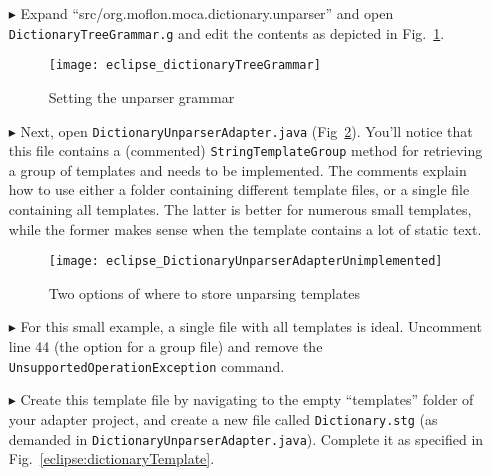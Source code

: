 \begin{itemize}

\item[$\blacktriangleright$] Expand ``src/org.moflon.moca.dictionary.unparser'' and open \texttt{Dict\-ion\-ary\-Tree\-Gram\-mar.g} and edit the contents as
depicted in Fig.~\ref{eclipse:treeGrammar}. 

\vspace{0.5cm}

\begin{figure}[htpb]
\begin{center}
  \texttt{[image: eclipse\_dictionaryTreeGrammar]}
  \caption{Setting the unparser grammar}
  \label{eclipse:treeGrammar}
\end{center}
\end{figure}

\newpage


\item[$\blacktriangleright$] Next, open \texttt{Dict\-ion\-ary\-Un\-pars\-er\-Ad\-ap\-ter.java} (Fig~\ref{eclipse:unparserCommented}). You'll notice that this
file contains a (commented) \texttt{StringTemplateGroup} method for retrieving a group of templates and needs to be implemented. The comments explain how to use
either a folder containing different template files, or a single file containing all templates. The latter is better for numerous small templates, while the
former makes sense when the template contains a lot of static text.

\vspace{0.5cm}

\begin{figure}[htpb]
\begin{center}
  \texttt{[image: eclipse\_DictionaryUnparserAdapterUnimplemented]}
  \caption{Two options of where to store unparsing templates}
  \label{eclipse:unparserCommented}
\end{center}
\end{figure}


\item[$\blacktriangleright$] For this small example, a single file with all templates is ideal. Uncomment line 44 (the option for a group file) and remove
the \texttt{Un\-sup\-port\-ed\-Op\-er\-at\-ion\-Ex\-cep\-tion} command.

\item[$\blacktriangleright$] Create this template file by navigating to the empty ``templates'' folder of your adapter project, and create a new file
called \texttt{Dictionary.stg} (as demanded in \texttt{Dict\-ion\-ary\-Un\-pars\-er\-Ad\-ap\-ter.java}). Complete it as specified in
Fig.~\ref{eclipse:dictionaryTemplate}.


\end{itemize}
